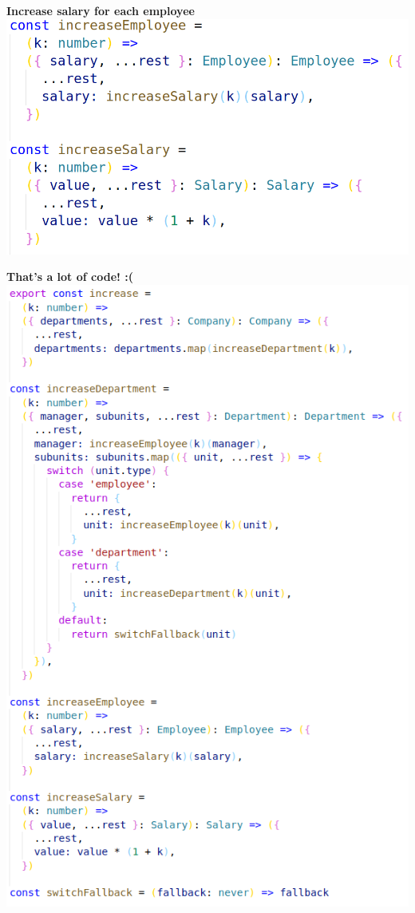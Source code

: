 \documentclass[14pt]{beamer}
\begin{document}
\begin{frame}
  \centering\textbf{Increase salary for each employee}
  \vfill
  \includegraphics[height=0.9\textheight,width=\textwidth,keepaspectratio]{graphics/increase-naive-step3-ts.png}
\end{frame}

\begin{frame}
  \centering\textbf{That's a lot of code! :(}
  \vfill
  \includegraphics[height=0.8\textheight,width=\textwidth,keepaspectratio]{graphics/increase-naive-ts.png}
\end{frame}
\end{document}
